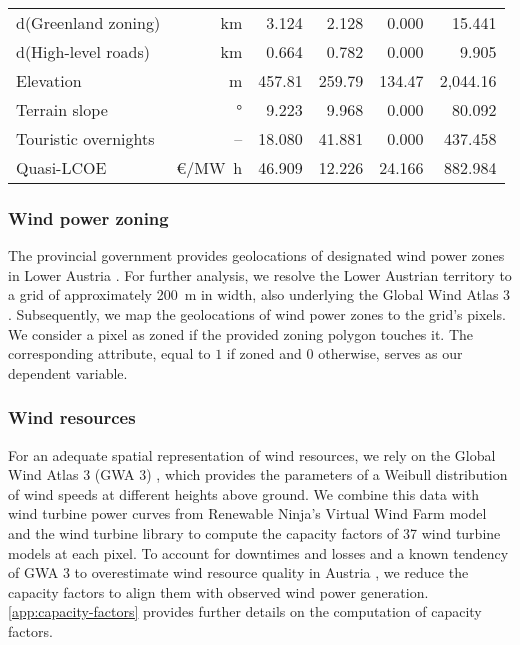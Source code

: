 \documentclass[review, a4paper, 12pt, authoryear, times]{elsarticle}
\begin{document}
\begin{ThreePartTable}
\begin{longtable}{lrrrrr}
d(Greenland zoning)         & \si{\kilo\metre}  & 3.124  & 2.128  & 0.000  & 15.441 \\
d(High-level roads)                    & \si{\kilo\metre}  & 0.664  & 0.782  & 0.000  & 9.905 \\
Elevation                   & \si{\metre}       & 457.81 & 259.79 & 134.47 & 2,044.16 \\
Terrain slope               & \si{\degree}      & 9.223  & 9.968  & 0.000  & 80.092 \\
Touristic overnights        & --                & 18.080 & 41.881 & 0.000  & 437.458 \\
Quasi-LCOE                  & \euro/\si{\mega\watt\hour} & 46.909 & 12.226 & 24.166 & 882.984 \\ 
\end{longtable}
\end{ThreePartTable}

\subsubsection{Wind power zoning}
The provincial government provides geolocations of designated wind power zones in Lower Austria \citep{LandNiederoesterreich2014}.
For further analysis, we resolve the Lower Austrian territory to a grid of approximately \SI{200}{\metre} in width, also underlying the Global Wind Atlas 3 \citep{DTU2022}.
Subsequently, we map the geolocations of wind power zones to the grid's pixels.
We consider a pixel as zoned if the provided zoning polygon touches it.
The corresponding attribute, equal to $1$ if zoned and $0$ otherwise, serves as our dependent variable.

\subsubsection{Wind resources} \label{data:wind-resources}
For an adequate spatial representation of wind resources, we rely on the Global Wind Atlas 3 (GWA 3) \citep{DTU2022}, which provides the parameters of a Weibull distribution of wind speeds at different heights above ground.
We combine this data with wind turbine power curves from Renewable Ninja's Virtual Wind Farm model \citep{Staffell2016} and the \cite{oep2019} wind turbine library to compute the capacity factors of 37 wind turbine models at each pixel. To account for downtimes and losses and a known tendency of GWA 3 to overestimate wind resource quality in Austria \citep{Gruber2019}, we reduce the capacity factors to align them with observed wind power generation.
\ref{app:capacity-factors} provides further details on the computation of capacity factors.
\end{document}
